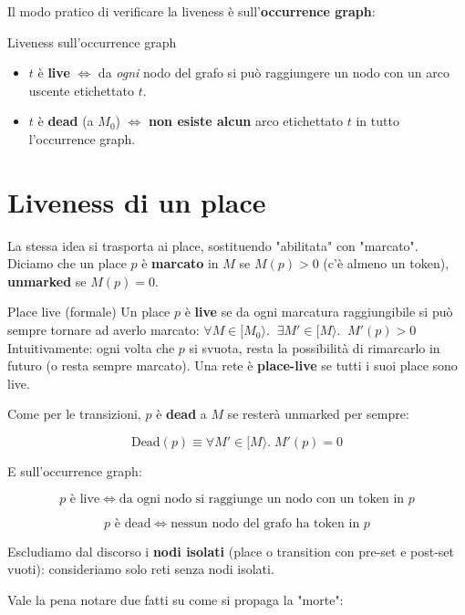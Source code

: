 Il modo pratico di verificare la liveness è sull'\textbf{occurrence graph}:

\begin{boxtip}{Liveness sull'occurrence graph}
\begin{itemize}
\item $t$ è \textbf{live} $\Longleftrightarrow$ da \emph{ogni} nodo del grafo si può raggiungere un nodo con un arco uscente etichettato $t$.
\item $t$ è \textbf{dead} (a $M_0$) $\Longleftrightarrow$ \textbf{non esiste alcun} arco etichettato $t$ in tutto l'occurrence graph.
\end{itemize}
\end{boxtip}

\section{\texorpdfstring{Liveness di un place}{Liveness di un place}}

La stessa idea si trasporta ai place, sostituendo "abilitata" con "marcato". Diciamo che un place $p$ è \textbf{marcato} in $M$ se $M(p) > 0$ (c'è almeno un token), \textbf{unmarked} se $M(p) = 0$.

\begin{boxdefinition}{Place live (formale)}
Un place $p$ è \textbf{live} se da ogni marcatura raggiungibile si può sempre tornare ad averlo marcato: \(\forall M \in [M_0\rangle.\;\; \exists M' \in [M\rangle.\;\; M'(p) > 0\) Intuitivamente: ogni volta che $p$ si svuota, resta la possibilità di rimarcarlo in futuro (o resta sempre marcato). Una rete è \textbf{place-live} se tutti i suoi place sono live.
\end{boxdefinition}

Come per le transizioni, $p$ è \textbf{dead} a $M$ se resterà unmarked per sempre:

\[
\text{Dead}(p) \equiv \forall M' \in [M\rangle.\; M'(p) = 0
\]

E sull'occurrence graph:

\[
p \text{ è live} \iff \text{da ogni nodo si raggiunge un nodo con un token in } p
\]

\[
p \text{ è dead} \iff \text{nessun nodo del grafo ha token in } p
\]

Escludiamo dal discorso i \textbf{nodi isolati} (place o transition con pre-set e post-set vuoti): consideriamo solo reti senza nodi isolati.

Vale la pena notare due fatti su come si propaga la "morte":

